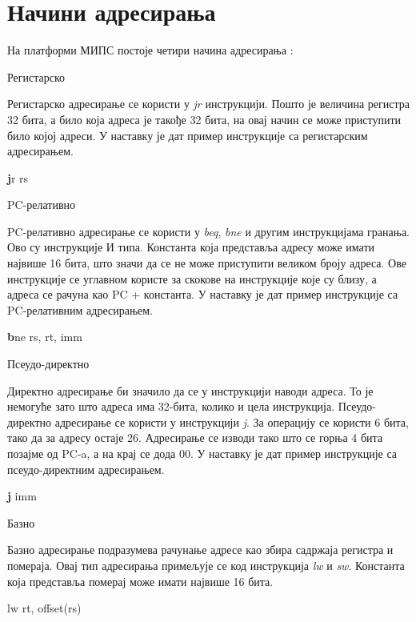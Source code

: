 \documentclass[12pt,oneside]{memoir}
\begin{document}
\section{Начини адресирања}
\label{adresiranje}

На платформи МИПС постоје четири начина адресирања \cite{adresiranje}:

\begin{description}
\item Регистарско

Регистарско адресирање се користи у \textit{jr} инструкцији. Пошто је величина регистра 32 бита, а било која адреса је такође 32 бита, на овај начин се може приступити било којој адреси. У наставку је дат пример инструкције са регистарским адресирањем.
\begin{listing}
\centering
\textbf jr rs
\end{listing}

\item PC-релативно

PC-релативно адресирање се користи у \textit{beq}, \textit{bne} и другим инструкцијама гранања. Ово су инструкције И типа. Константа која представља адресу може имати највише 16 бита, што значи да се не може приступити великом броју адреса. Ове инструкције се углавном користе за скокове на инструкције које су близу, а адреса се рачуна као PC + константа. У наставку је дат пример инструкције са PC-релативним адресирањем.
\begin{listing}
\centering
\textbf bne rs, rt, imm
\end{listing}

\item Псеудо-директно

Директно адресирање би значило да се у инструкцији наводи адреса. То је немогуће зато што адреса има 32-бита, колико и цела инструкција. Псеудо-директно адресирање се користи у инструкцији \textit{j}. За операцију се користи 6 бита, тако да за адресу остаје 26. Адресирање се изводи тако што се горња 4 бита позајме од PC-a, а на крај се дода 00. У наставку је дат пример инструкције са псеудо-директним адресирањем.

\begin{listing}
\centering
\textbf j imm
\end{listing}

\item Базно

Базно адресирање подразумева рачунање адресе као збира садржаја регистра и помераја. Овај тип адресирања примељује се код инструкција \textit{lw} и \textit{sw}. Константа која представља померај може имати највише 16 бита.

\begin{listing}
lw rt, offset(rs)
\centering
\end{listing}
\end{description}
\end{document}
